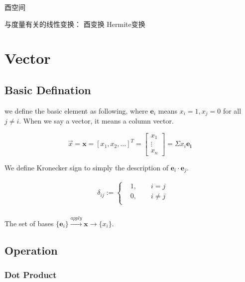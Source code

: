 \documentclass[UTF8]{../../09-Mathematics}
\begin{document}
酉空间 


与度量有关的线性变换：
酉变换
Hermite变换






\chapter{Vector}


\section{Basic Defination}

we define the basic element as following, where $ \boldsymbol e_i $ means $x_i = 1, x_j = 0$ for all $j \neq i$. When we say a vector, it means a column vector.

\begin{equation}
\vec{x}  = \boldsymbol x = [x_1, x_2,\dots]^T
= \begin{bmatrix}
    x_1 \\
    \vdots \\
    x_n
\end{bmatrix}
= \Sigma x_i \boldsymbol{e_i} 
\end{equation}

We define Kronecker sign to simply the description of $\boldsymbol e_i \cdot \boldsymbol e_j $.

\begin{equation}
    \begin{split}
    &\delta _{ij}:=
    \begin{cases}
    &1,\qquad i = j\\
    &0,\qquad i \neq j\\
    \end{cases}\\
    \end{split}
\end{equation}

The set of bases $\{ \boldsymbol e_i  \}  \xrightarrow{apply} \boldsymbol{x} \longrightarrow    \{ x_i \}   $.





\section{Operation}




\subsection{Dot Product}
\end{document}
